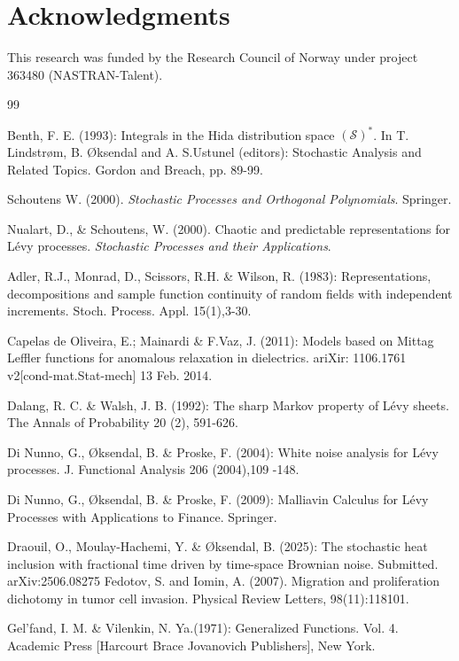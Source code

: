 \documentclass[12pt]{article}%
\numberwithin{equation}{section}
\def\S{\mathcal{S}}
\begin{document}
\section{Acknowledgments}
 This research was funded by the Research Council of Norway under project 363480 (NASTRAN-Talent).

\begin{thebibliography}{99}

 Benth, F. E. (1993): Integrals in the Hida distribution space $(\S)^{*}$.
In T. Lindstr\o m, B. \O ksendal and A. S.Ustunel (editors): Stochastic Analysis and Related Topics. Gordon
and Breach, pp. 89-99.

 Schoutens W. (2000). \textit{Stochastic Processes and Orthogonal Polynomials}. Springer.

 Nualart, D., \& Schoutens, W. (2000). Chaotic and predictable representations for L\' evy processes. \textit{Stochastic Processes and their Applications}.

 
 Adler, R.J., Monrad, D., Scissors, R.H. \& Wilson, R. (1983): Representations, decompositions and sample
function continuity of random fields with independent increments. Stoch. Process. Appl. 15(1),3-30.
  
 Capelas de Oliveira, E.; Mainardi \& F.Vaz, J. (2011): Models based on Mittag Leffler functions for anomalous relaxation in dielectrics. ariXir: 1106.1761  v2[cond-mat.Stat-mech] 13 Feb. 2014.

 Dalang, R. C. \& Walsh, J. B. (1992): The sharp Markov property of L\'evy sheets. The Annals of Probability 20 (2), 591-626.

 Di Nunno, G., \O ksendal, B. \& Proske, F. (2004):
White noise analysis for L\' evy processes. 
J. Functional Analysis 206 (2004),109 -148.

   Di Nunno, G., \O ksendal, B. \& Proske, F. (2009): Malliavin Calculus for L\' evy Processes with Applications to Finance. Springer.
  
  Draouil, O., Moulay-Hachemi, Y. \& \O ksendal, B. (2025): The stochastic heat inclusion with fractional time driven by  time-space Brownian noise. Submitted.
 	arXiv:2506.08275
Fedotov, S. and Iomin, A. (2007).
  Migration and proliferation dichotomy in tumor cell invasion.
 Physical Review Letters, 98(11):118101.  
    
  Gel'fand, I. M. \& Vilenkin, N. Ya.(1971): Generalized Functions. Vol. 4. Academic Press [Harcourt Brace Jovanovich Publishers], New York.
 

\end{thebibliography}
\end{document}

